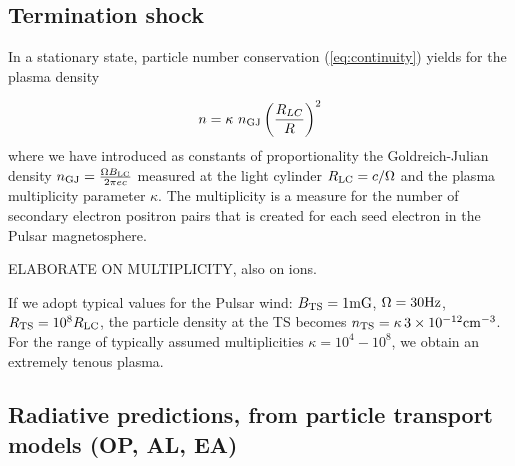 \subsection{Termination shock}


In a stationary state, particle number conservation (\ref{eq:continuity}) yields for the plasma density

\begin{align}
  n=\kappa\ n_{\rm GJ} \left(\frac{R_{LC}}{R}\right)^2
\end{align}
where we have introduced as constants of proportionality the Goldreich-Julian density \citep{1969ApJ...157..869G} $n_{\rm GJ} = \frac{\Omega B_{\rm LC}}{2 \pi e c}$ measured at the light cylinder $R_{\rm LC}=c/\Omega$ and the plasma multiplicity parameter $\kappa$.  The multiplicity is a measure for the number of secondary electron positron pairs that is created for each seed electron in the Pulsar magnetosphere.

ELABORATE ON MULTIPLICITY, also on ions.

If we adopt typical values for the Pulsar wind: $B_{\rm TS}=1\rm m G$, $\Omega=30\rm Hz$, $R_{\rm TS}=10^8R_{\rm LC}$, the particle density at the TS becomes $n_{\rm TS} = \kappa\, 3\times 10^{-12}\rm cm^{-3}$.
For the range of typically assumed multiplicities $\kappa=10^{4}-10^{8}$, we obtain an extremely tenous plasma.  




\subsection{Radiative predictions, from particle transport models      (OP, AL, EA)}